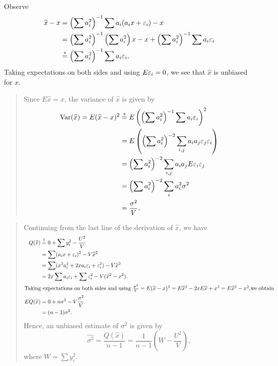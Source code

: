 \documentclass{homework}
\begin{document}
\vspace{-1em}

Observe
\begin{align*}
   \widehat x - x
   &= \left(\sum a_i^2\right)^{-1} \sum a_i (a_i x + \varepsilon_i)  - x \\
   &= \left(\sum a_i^2\right)^{-1} \left(\sum a_i^2\right) x - x + \left(\sum a_i^2\right)^{-1} \sum a_i\varepsilon_i\\
   &\stackrel*=\left(\sum a_i^2\right)^{-1} \sum a_i\varepsilon_i.
\end{align*}
\vspace{-1em}
Taking expectations on both sides and using $E\varepsilon_i = 0$, we see that $\hat x$ is unbiased for $x$.

\newpage
{}

\begin{quote}
Since $E\hat x = x$, the variance of $\hat x$ is given by 
\begin{align*}
  \mathrm{Var}(\widehat x) = E(\widehat x - x)^2 
  &\stackrel*=E\left(\left(\sum a_i^2\right)^{-1} \sum a_i\varepsilon_i\right)^2\\
  &=E\left(\left(\sum a_i^2\right)^{-2} \sum_{i,j} a_ia_j\varepsilon_j\varepsilon_i\right)\\
  &=\left(\sum a_i^2\right)^{-2} \sum_{i,j} a_ia_j E\varepsilon_i\varepsilon_j\\
  &=\left(\sum a_i^2\right)^{-2} \sum_{i} a_i^2 \sigma^2\\
  &=\frac{\sigma^2}{V} . 
\end{align*}
\end{quote}


\begin{quote}
  Continuing from the last line of the derivation of $\hat x$, we have
  \begin{align*}
    Q(\widehat x) 
    &\stackrel\dagger= 0 + \sum y_i^2 - \frac{U^2}{V} \\
    &= \sum (a_i x + \varepsilon_i) ^2 - V\widehat x^2 \\
    &= \sum (x^2a_i^2 +2xa_i\varepsilon_i + \varepsilon_i^2) - V\widehat x^2 \\
    &= 2x\sum a_i\varepsilon_i + \sum \varepsilon_i^2 - V(\widehat x^2 - x^2). \\
    \intertext{Taking expectations on both sides and using $\frac{\sigma^2}{V} = E(\widehat x - x)^2 = E\widehat x^2 - 2xE\widehat x + x^2 = E\widehat x^2 - x^2$,we obtain}
    EQ(\widehat x) &= 0 + n\sigma^2 - V \frac{\sigma^2}{V}\\
   &= (n-1)\sigma^2.
  \end{align*}
  Hence, an unbiased estimate of $\sigma^2$ is given by
  $$
  \hat{\sigma^2} = \frac{Q(\hat x)}{n-1} = \frac 1{n-1} \left(W - \frac{U^2}{V}\right),
  $$
  where $W = \sum y_i^2$.
\end{quote}
\end{document}
